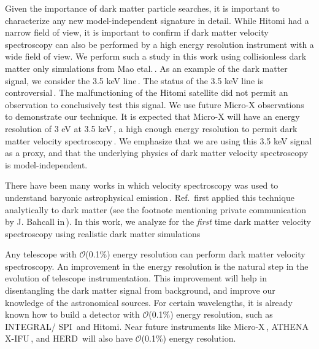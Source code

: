 \documentclass[aps,prd,10pt,twocolumn,superscriptaddress,showpacs]{revtex4-1}
\begin{document}
Given the importance of dark matter particle searches, it is important to characterize any new model-independent signature in detail.  While Hitomi had a narrow field of view, it is important to confirm if dark matter velocity spectroscopy can also be performed by a high energy resolution instrument with a wide field of view.  We perform such a study in this work using collisionless dark matter only simulations from Mao etal.\,\cite{mao2015}.  As an example of the dark matter signal, we consider the 3.5 keV line\,\cite{Bulbul:2014sua,Boyarsky:2014jta}.  The status of the 3.5 keV line is controversial\,\cite{Iakubovskyi:2015wma,Jeltema:2015mee,Ruchayskiy:2015onc,Bulbul:2016yop,Aharonian:2016gzq,Hofmann:2016urz,Arguelles:2016uwb,Conlon:2016lxl,Neronov:2016wdd,Perez:2016tcq}.  The malfunctioning of the Hitomi satellite did not permit an observation to conclusively test this signal.  We use future Micro-X observations\,\cite{Figueroa-Feliciano:2015gwa} to demonstrate our technique.  It is expected that Micro-X will have an energy resolution of 3 eV at 3.5 keV\,\cite{Figueroa-Feliciano:2015gwa}, a high enough energy resolution to permit dark matter velocity spectroscopy\,\cite{speckhard2016}.  We emphasize that we are using this 3.5 keV signal as a proxy, and that the underlying physics of dark matter velocity spectroscopy is model-independent. 

There have been many works in which velocity spectroscopy was used to understand baryonic astrophysical emission\,\cite{Dame:2000sp,Diehl:2006cf,Kalberla:2008uu,Kretschmer:2013naa}.  Ref.\,\cite{speckhard2016} first applied this technique analytically to dark matter (see the footnote mentioning private communication by J. Bahcall in\,\cite{Turner:1986vr}).  In this work, we analyze for the {\it first} time dark matter velocity spectroscopy using realistic dark matter simulations 

Any telescope with $\mathcal{O}$(0.1\%) energy resolution can perform dark matter velocity spectroscopy.  An improvement in the energy resolution is the natural step in the evolution of telescope instrumentation.  This improvement will help in disentangling the dark matter signal from background, and improve our knowledge of the astronomical sources.  For certain wavelengths, it is already known how to build a detector with $\mathcal{O}$(0.1\%) energy resolution, such as INTEGRAL/ SPI\,\cite{2003AA} and Hitomi.  Near future instruments like Micro-X\,\cite{Figueroa-Feliciano:2015gwa}, ATHENA X-IFU\,\cite{Barret:2016ett}, and HERD\,\cite{Wang:2015ema} will also have $\mathcal{O}$(0.1\%) energy resolution.
\end{document}
